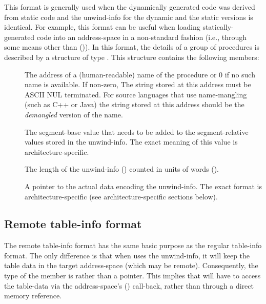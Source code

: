 \documentclass{article}
\begin{document}
This format is generally used when the dynamically generated code was
derived from static code and the unwind-info for the dynamic and the
static versions is identical.  For example, this format can be useful
when loading statically-generated code into an address-space in a
non-standard fashion (i.e., through some means other than
()).  In this format, the details of a group of procedures
is described by a structure of type .
This structure contains the following members:
\begin{description}

\item[ ] The address of a
  (human-readable) name of the procedure or 0 if no such name is
  available.  If non-zero, The string stored at this address must be
  ASCII NUL terminated.  For source languages that use name-mangling
  (such as C++ or Java) the string stored at this address should be
  the \emph{demangled} version of the name.

\item[ ] The segment-base value
  that needs to be added to the segment-relative values stored in the
  unwind-info.  The exact meaning of this value is
  architecture-specific.

\item[ ] The length of the
  unwind-info () counted in units of words
  ().

\item[ ] A pointer to the actual
  data encoding the unwind-info.  The exact format is
  architecture-specific (see architecture-specific sections below).

\end{description}

\subsection{Remote table-info format}

The remote table-info format has the same basic purpose as the regular
table-info format.  The only difference is that when 
uses the unwind-info, it will keep the table data in the target
address-space (which may be remote).  Consequently, the type of the
 member is  rather than a pointer.
This implies that  will have to access the table-data
via the address-space's () call-back, rather than
through a direct memory reference.
\end{document}
